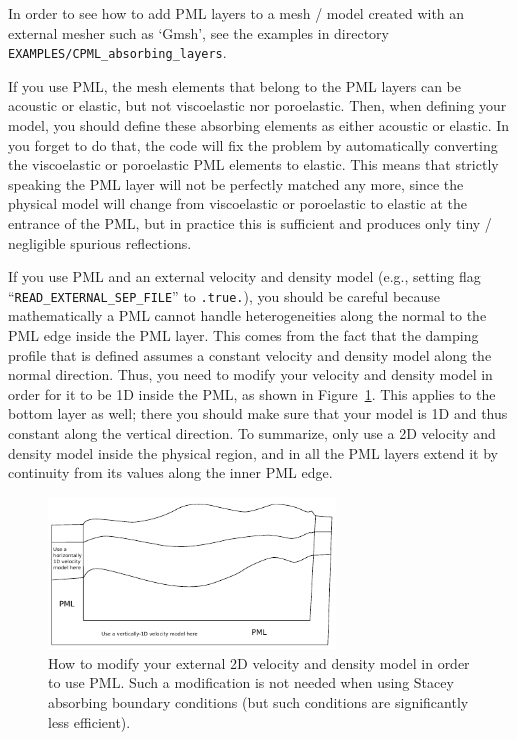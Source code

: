 \documentclass[oneside,english,onecolumn,letterpaper]{book}
\begin{document}
In order to see how to add PML layers to a mesh / model created with an external mesher such as `Gmsh', see the examples in directory
\texttt{EXAMPLES/CPML\_absorbing\_layers}.

If you use PML, the mesh elements that belong to the PML layers can be acoustic or elastic, but not viscoelastic nor poroelastic.
Then, when defining your model, you should define these absorbing elements as either acoustic or elastic.
In you forget to do that, the code will fix the problem by automatically converting the viscoelastic or poroelastic PML
elements to elastic. This means that strictly speaking the PML layer will not be perfectly matched any more, since the physical
model will change from viscoelastic or poroelastic to elastic at the entrance of the PML, but in practice this is sufficient and
produces only tiny / negligible spurious reflections.

If you use PML and an external velocity and density model (e.g., setting flag ``\texttt{READ\_EXTERNAL\_SEP\_FILE}'' to \texttt{.true.}),
you should be careful because mathematically a PML cannot handle heterogeneities along the
normal to the PML edge inside the PML layer. This comes from the fact that the damping profile
that is defined assumes a constant velocity and density model along the normal
direction.
Thus, you need to modify your velocity and density model in order for it to be 1D inside
the PML, as shown in Figure~\ref{fig:modify_external_velocity_model_to_use_PML}.
This applies to the bottom layer as well; there you should make sure
that your model is 1D and thus constant along the vertical direction.
To summarize, only use a 2D velocity and density model inside the physical region, and in
all the PML layers extend it by continuity from its values along the
inner PML edge.

\begin{figure}[htbp]
\centering
\includegraphics[width=3in]{figures/how_to_use_PML_when_READ_EXTERNAL_SEP_FILE_is_true}
\caption{How to modify your external 2D velocity and density model in order to use PML.
Such a modification is not needed when using Stacey absorbing boundary conditions (but such conditions
are significantly less efficient).}
\label{fig:modify_external_velocity_model_to_use_PML}
\end{figure}
\end{document}
